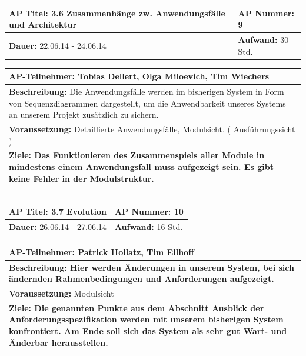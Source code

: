 \documentclass[fontsize=12pt,paper=a4,twoside]{scrartcl}
\begin{document}
\begin{tabular}{|p{7.43cm}|p{7.43cm}|}
\hline
\textbf{AP Titel: }3.6 Zusammenhänge zw. Anwendungsfälle und Architektur & \textbf{AP Nummer: }9\\ 
\hline
\textbf{Dauer: }22.06.14 - 24.06.14& \textbf{Aufwand: }30 Std.\\
\hline
\end{tabular}
\begin{tabular}{|p{15.3cm}|}
\hline
\textbf{AP-Teilnehmer: }Tobias Dellert, Olga Miloevich, Tim Wiechers\\
\hline
\textbf{Beschreibung: } Die Anwendungsfälle werden im bisherigen System in Form von Sequenzdiagrammen dargestellt, um die Anwendbarkeit unseres Systems an unserem Projekt
zusätzlich zu sichern.\\
\hline
\textbf{Voraussetzung: }Detaillierte Anwendungsfälle, Modulsicht, ( Ausführungssicht )\\
\hline 
\textbf{Ziele: Das Funktionieren des Zusammenspiels aller Module in mindestens einem Anwendungsfall muss aufgezeigt sein. Es gibt keine Fehler in der Modulstruktur.}\\
\hline 
\end{tabular}
\begin{verbatim}

\end{verbatim}

\begin{tabular}{|p{7.43cm}|p{7.43cm}|}
\hline
\textbf{AP Titel: } 3.7 Evolution & \textbf{AP Nummer: }10\\ 
\hline
\textbf{Dauer: }26.06.14 - 27.06.14& \textbf{Aufwand: }16 Std.\\
\hline
\end{tabular}
\begin{tabular}{|p{15.3cm}|}
\hline
\textbf{AP-Teilnehmer: }Patrick Hollatz, Tim Ellhoff\\
\hline
\textbf{Beschreibung: Hier werden Änderungen in unserem System, bei sich ändernden Rahmenbedingungen und Anforderungen aufgezeigt.}\\
\hline
\textbf{Voraussetzung: }Modulsicht\\
\hline 
\textbf{Ziele: Die genannten Punkte aus dem Abschnitt Ausblick der Anforderungsspezifikation 
werden mit unserem bisherigen System konfrontiert. Am Ende soll sich das System als sehr gut Wart- und Änderbar herausstellen.}\\
\hline 
\end{tabular}
\begin{verbatim}

\end{verbatim}
\end{document}
